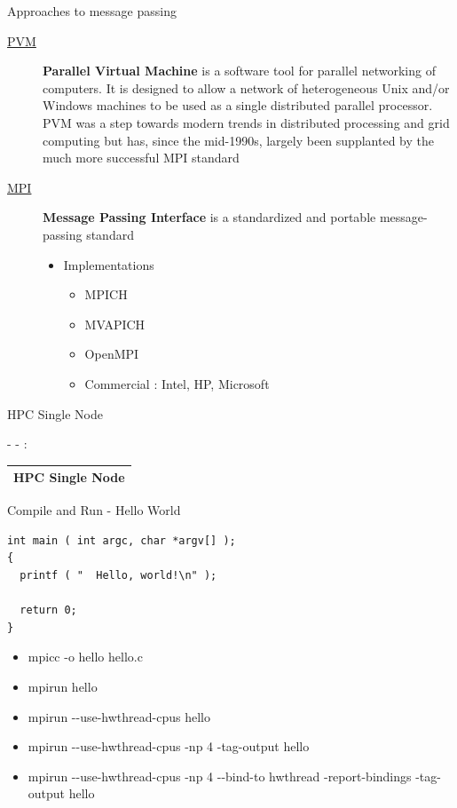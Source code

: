 \documentclass[ignorenonframetext,]{beamer}
\providecommand{\tightlist}{%
  \setlength{\itemsep}{0pt}\setlength{\parskip}{0pt}}
\begin{document}
\begin{frame}{Approaches to message passing}

\begin{description}
\item[\href{https://en.wikipedia.org/wiki/Parallel_Virtual_Machine}{PVM}]
\textbf{Parallel Virtual Machine} is a software tool for parallel
networking of computers. It is designed to allow a network of
heterogeneous Unix and/or Windows machines to be used as a single
distributed parallel processor. PVM was a step towards modern trends in
distributed processing and grid computing but has, since the mid-1990s,
largely been supplanted by the much more successful MPI standard
\item[\href{https://tinyurl.com/6mfo5pf}{MPI}]
\textbf{Message Passing Interface} is a standardized and portable
message-passing standard

\begin{itemize}
\tightlist
\item
  Implementations

  \begin{itemize}
  \tightlist
  \item
    MPICH
  \item
    MVAPICH
  \item
    OpenMPI
  \item
    Commercial : Intel, HP, Microsoft
  \end{itemize}
\end{itemize}
\end{description}

\end{frame}

\begin{frame}{HPC Single Node}

- - :

\begin{longtable}[]{@{}l@{}}
\toprule
\endhead
HPC Single Node\tabularnewline
\bottomrule
\end{longtable}

\end{frame}

\begin{frame}[fragile]{Compile and Run - Hello World}

\begin{verbatim}
int main ( int argc, char *argv[] );
{
  printf ( "  Hello, world!\n" );

  return 0;
}

\end{verbatim}

\begin{itemize}
\tightlist
\item
  mpicc -o hello hello.c
\item
  mpirun hello
\item
  mpirun -\/-use-hwthread-cpus hello
\item
  mpirun -\/-use-hwthread-cpus -np 4 -tag-output hello
\item
  mpirun -\/-use-hwthread-cpus -np 4 -\/-bind-to hwthread
  -report-bindings -tag-output hello
\end{itemize}


\end{frame}
\end{document}
